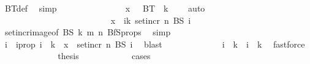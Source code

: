 \begin{isabellebody}
\ BT{\isacharunderscore}{\kern0pt}def\ \isamarkupfalse%
\ simp\isanewline
\ \ \ \ \ \ \ \ \ \ \ \ \isamarkupfalse%
\ \isamarkupfalse%
\ {\isachardoublequoteopen}x\ {\isasymin}\ {\isasymUnion}\ {\isacharparenleft}{\kern0pt}BT\ {\isacharbackquote}{\kern0pt}\ {\isacharbraceleft}{\kern0pt}{\isachardot}{\kern0pt}{\isachardot}{\kern0pt}k\ {\isacharplus}{\kern0pt}\ {}{\isacharbraceright}{\kern0pt}{\isacharparenright}{\kern0pt}{\isachardoublequoteclose}\ \isamarkupfalse%
\ auto\isanewline
\ \ \ \ \ \ \ \ \ \ \isamarkupfalse%
\isanewline
\ \ \ \ \ \ \ \ \isamarkupfalse%
\isanewline
\ \ \ \ \ \ \ \ \ \ \isamarkupfalse%
\ {}\isanewline
\ \ \ \ \ \ \ \ \ \ \isamarkupfalse%
\ \isamarkupfalse%
\ {\isachardoublequoteopen}x\ {\isasymin}\ {\isacharparenleft}{\kern0pt}{\isasymUnion}i{\isasymle}k{\isachardot}{\kern0pt}\ set{\isacharunderscore}{\kern0pt}incr\ n\ {\isacharparenleft}{\kern0pt}BS\ i{\isacharparenright}{\kern0pt}{\isacharparenright}{\kern0pt}{\isachardoublequoteclose}\ \isamarkupfalse%
\ set{\isacharunderscore}{\kern0pt}incr{\isacharunderscore}{\kern0pt}image{\isacharbrackleft}{\kern0pt}of\ BS\ k\ m\ n{\isacharbrackright}{\kern0pt}\ BfS{\isacharunderscore}{\kern0pt}props\ \isamarkupfalse%
\ simp\isanewline
\ \ \ \ \ \ \ \ \ \ \isamarkupfalse%
\ \isamarkupfalse%
\ i\ \ i{\isacharunderscore}{\kern0pt}prop{\isacharcolon}{\kern0pt}\ {\isachardoublequoteopen}i\ {\isasymle}\ k\ {\isasymand}\ x\ {\isasymin}\ set{\isacharunderscore}{\kern0pt}incr\ n\ {\isacharparenleft}{\kern0pt}BS\ i{\isacharparenright}{\kern0pt}{\isachardoublequoteclose}\ \isamarkupfalse%
\ blast\isanewline
\ \ \ \ \ \ \ \ \ \ \isamarkupfalse%
\ \isamarkupfalse%
\ {\isachardoublequoteopen}i\ {\isacharequal}{\kern0pt}\ k{\isachardoublequoteclose}\ {\isacharbar}{\kern0pt}\ {\isachardoublequoteopen}i\ {\isacharless}{\kern0pt}\ k{\isachardoublequoteclose}\ \isamarkupfalse%
\ fastforce\isanewline
\ \ \ \ \ \ \ \ \ \ \isamarkupfalse%
\ \isamarkupfalse%
\ {\isacharquery}{\kern0pt}thesis\isanewline
\ \ \ \ \ \ \ \ \ \ \isamarkupfalse%
\ {\isacharparenleft}{\kern0pt}cases{\isacharparenright}{\kern0pt}\isanewline
\ \ \ \ \ \ \ \ \ \ \ \ \isamarkupfalse%
\ {}\isanewline
\ \ \ \ \ \ \ \ \ \ \ \ \isamarkupfalse%

\end{isabellebody}
